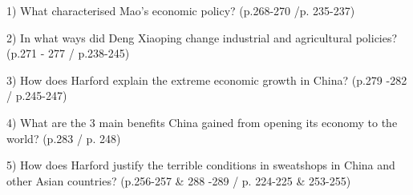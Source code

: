 1) What characterised Mao’s economic policy? (p.268-270 /p. 235-237)

2) In what ways did Deng Xiaoping change industrial and agricultural policies? (p.271 - 277 / p.238-245)

3) How does Harford explain the extreme economic growth in China? (p.279 -282 / p.245-247)

4) What are the 3 main benefits China gained from opening its economy to the world? (p.283 / p. 248)

5) How does Harford justify the terrible conditions in sweatshops in China and other Asian countries? (p.256-257 \& 288 -289 / p. 224-225 \& 253-255)